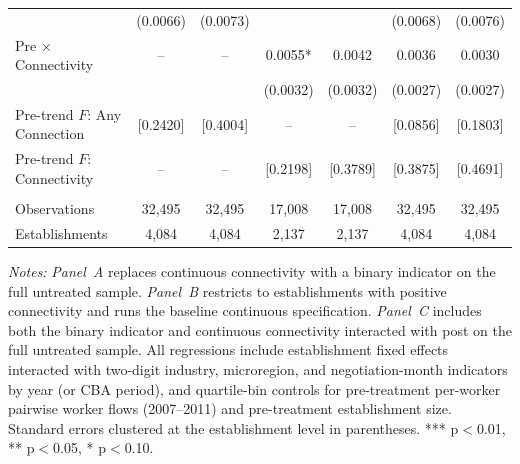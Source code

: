\documentclass[12pt,letterpaper]{article}
\begin{document}
\begin{table}[]
\begin{threeparttable}
\begin{tabular}{lcccccc}
  & (0.0066) & (0.0073) & &  & (0.0068) & (0.0076) \\
Pre $\times$ Connectivity & -- & -- & 0.0055* & 0.0042 & 0.0036 & 0.0030 \\
  & &  & (0.0032) & (0.0032) & (0.0027) & (0.0027) \\
Pre-trend $F$: Any Connection & [0.2420] & [0.4004] & -- & -- & [0.0856] & [0.1803] \\
Pre-trend $F$: Connectivity & -- & -- & [0.2198] & [0.3789] & [0.3875] & [0.4691] \\
 & & & & & & \\
Observations & 32{,}495 & 32{,}495 & 17{,}008 & 17{,}008 & 32{,}495 & 32{,}495 \\
Establishments & 4{,}084 & 4{,}084 & 2{,}137 & 2{,}137 & 4{,}084 & 4{,}084 \\
\bottomrule
\end{tabular}
\scriptsize
\begin{tablenotes}
\item \textit{Notes:} \textit{Panel~A} replaces continuous connectivity with a binary indicator on the full untreated sample. \textit{Panel~B} restricts to establishments with positive connectivity and runs the baseline continuous specification. \textit{Panel~C} includes both the binary indicator and continuous connectivity interacted with post on the full untreated sample. All regressions include establishment fixed effects interacted with two-digit industry, microregion, and negotiation-month indicators by year (or CBA period), and quartile-bin controls for pre-treatment per-worker pairwise worker flows (2007--2011) and pre-treatment establishment size. Standard errors clustered at the establishment level in parentheses. *** p$<$0.01, ** p$<$0.05, * p$<$0.10.
\end{tablenotes}
\end{threeparttable}
\end{table}

\clearpage
\end{document}
